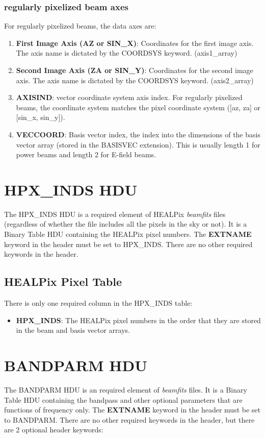 \documentclass[11pt, oneside]{article}   	%
\begin{document}
\subsubsection{regularly pixelized beam axes}
For regularly pixelized beams, the data axes are: 
\begin{enumerate}
\item{\textbf{First Image Axis (AZ or SIN\_X)}: Coordinates for the first image axis. The axis name is dictated by the COORDSYS keyword. (axis1\_array)}
\item{\textbf{Second Image Axis (ZA or SIN\_Y)}: Coordinates for the second image axis. The axis name is dictated by the COORDSYS keyword. (axis2\_array)}
\item{\textbf{AXISIND}: vector coordinate system axis index. For regularly pixelized beams, the coordinate system matches the pixel coordinate system ([az, za] or [sin\_x, sin\_y]).}
\item{\textbf{VECCOORD}: Basis vector index, the index into the dimensions of the basis vector array (stored in the BASISVEC extension). This is usually length 1 for power beams and length 2 for E-field beams.}
\end{enumerate}

\section{HPX\_INDS HDU}
The HPX\_INDS HDU is a required element of HEALPix \textit{beamfits} files (regardless of whether the file includes all the pixels in the sky or not). It is a Binary Table HDU containing the HEALPix pixel numbers.
The \textbf{EXTNAME} keyword in the header must be set to HPX\_INDS. There are no other required keywords in the header.

\subsection{HEALPix Pixel Table}
There is only one required column in the HPX\_INDS table:

\begin{itemize}
\item{\textbf{HPX\_INDS}: The HEALPix pixel numbers in the order that they are stored in the beam and basis vector arrays.}
\end{itemize}

\section{BANDPARM HDU}
The BANDPARM HDU is an required element of \textit{beamfits} files. It is a Binary Table HDU containing the bandpass and other optional parameters that are functions of frequency only.
The \textbf{EXTNAME} keyword in the header must be set to BANDPARM. There are no other required keywords in the header, but there are 2 optional header keywords:
\end{document}
